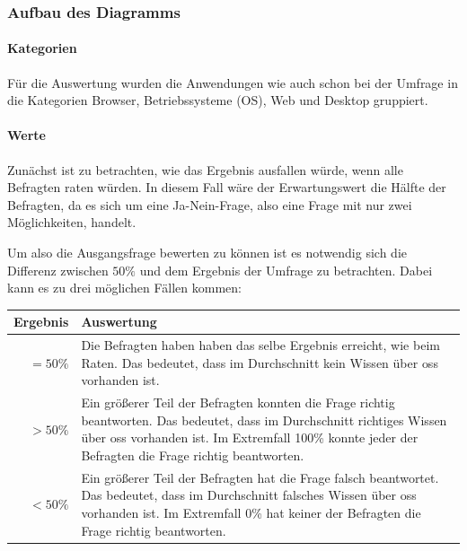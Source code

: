 \documentclass[a4paper]{article}
\begin{document}
            
            \subsubsection{Aufbau des Diagramms}
                \paragraph{Kategorien}
                    Für die Auswertung wurden die Anwendungen wie auch schon bei der Umfrage in die Kategorien Browser, Betriebssysteme (OS), Web und Desktop gruppiert.
                    
                \paragraph{Werte}
                    Zunächst ist zu betrachten, wie das Ergebnis ausfallen würde, wenn alle Befragten raten würden. In diesem Fall wäre der Erwartungswert die Hälfte der Befragten, da es sich um eine Ja-Nein-Frage, also eine Frage mit nur zwei Möglichkeiten, handelt.
                    
                    Um also die Ausgangsfrage bewerten zu können ist es notwendig sich die Differenz zwischen $50\%$ und dem Ergebnis der Umfrage zu betrachten. Dabei kann es zu drei möglichen Fällen kommen:\\
            
                    \begin{tabularx}{\textwidth}{rX}
                        \textbf{Ergebnis} & \textbf{Auswertung} \\\hline
                        $= 50\%$ & Die Befragten haben haben das selbe Ergebnis erreicht, wie beim Raten. Das bedeutet, dass im Durchschnitt kein Wissen über \gls{oss} vorhanden ist.\\
                        $> 50\%$ & Ein größerer Teil der Befragten konnten die Frage richtig beantworten. Das bedeutet, dass im Durchschnitt richtiges Wissen über \gls{oss} vorhanden ist. Im Extremfall 100\% konnte jeder der Befragten die Frage richtig beantworten.\\
                        $< 50\%$ & Ein größerer Teil der Befragten hat die Frage falsch beantwortet. Das bedeutet, dass im Durchschnitt falsches Wissen über \gls{oss} vorhanden ist. Im Extremfall 0\% hat keiner der Befragten die Frage richtig beantworten.  
                    \end{tabularx}
            
\end{document}
